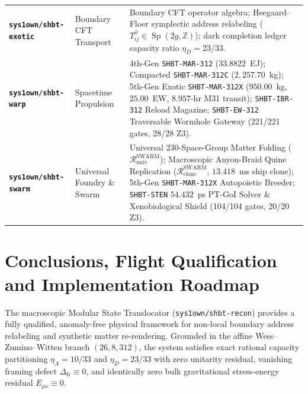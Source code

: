 \documentclass[11pt,onecolumn]{article}
\begin{document}
\begin{table}[!htbp]
\begin{tabularx}{\textwidth}{@{}p{4.2cm} p{4.2cm} X@{}}
\addlinespace
\textbf{\texttt{sys1own/shbt-exotic}} & Boundary CFT Transport & Boundary CFT operator algebra; Heegaard--Floer symplectic address relabeling ($T_{ij}^\partial \in \operatorname{Sp}(2g,\mathbb{Z})$); dark completion ledger capacity ratio $\eta_D = 23/33$. \\
\addlinespace
\textbf{\texttt{sys1own/shbt-warp}} & Spacetime Propulsion & 4th-Gen \texttt{SHBT-MAR-312} ($33.8822$~EJ); Compacted \texttt{SHBT-MAR-312C} ($2{,}257.70$~kg); 5th-Gen Exotic \texttt{SHBT-MAR-312X} ($950.00$~kg, $25.00$~EW, $8.957$-hr M31 transit); \texttt{SHBT-IBR-312} Reload Magazine; \texttt{SHBT-EW-312} Traversable Wormhole Gateway (221/221 gates, 28/28 Z3). \\
\addlinespace
\textbf{\texttt{sys1own/shbt-swarm}} & Universal Foundry \& Swarm & Universal 230-Space-Group Matter Folding ($\mathcal{R}_{\text{univ}}^{\text{SWARM}}$); Macroscopic Anyon-Braid Quine Replication ($\mathcal{R}_{\text{clone}}^{\text{SWARM}}$, $13.418$~ms ship clone); 5th-Gen \texttt{SHBT-MAR-312X} Autopoietic Breeder; \texttt{SHBT-STEN} $54.432$~ps PT-GoI Solver \& Xenobiological Shield (104/104 gates, 20/20 Z3). \\
\bottomrule
\end{tabularx}
\end{table}

\FloatBarrier
\section[Conclusions, Flight Qualification and Implementation Roadmap]{Conclusions, Flight Qualification and Implementation Roadmap}
\label{sec:conclusion}

The macroscopic Modular State Translocator (\texttt{sys1own/shbt-recon}) provides a fully qualified, anomaly-free physical framework for non-local boundary address relabeling and synthetic matter re-rendering. Grounded in the affine Wess--Zumino--Witten branch $(26, 8, 312)$, the system satisfies exact rational capacity partitioning $\eta_A = 10/33$ and $\eta_D = 23/33$ with zero unitarity residual, vanishing framing defect $\Delta_{\text{fr}} \equiv 0$, and identically zero bulk gravitational stress-energy residual $E_{\mu\nu} \equiv 0$.
\end{document}
